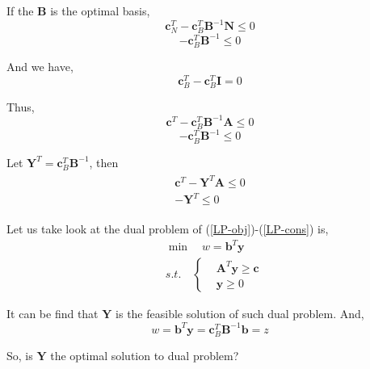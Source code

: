 \documentclass{article}
\begin{document}
If the $\bm{B}$ is the optimal basis, 
\begin{equation}
	\bm{c}^T_N - \bm{c}^T_B\bm{B}^{-1}\bm{N} \leq 0
\end{equation} 
\begin{equation}
	-\bm{c}^T_B\bm{B}^{-1} \leq 0
\end{equation}

And we have, 
\begin{equation}
	\bm{c}^T_B - \bm{c}^T_B\bm{I} = 0 
\end{equation}

Thus, 
\begin{equation}
	\bm{c}^T - \bm{c}^T_B\bm{B}^{-1}\bm{A} \leq 0
\end{equation}
\begin{equation}
	-\bm{c}^T_B \bm{B}^{-1} \leq 0
\end{equation}

Let $\bm{Y}^T = \bm{c}^T_B\bm{B}^{-1}$, then
\begin{align}
 	\begin{aligned}
 		\bm{c}^T - \bm{Y}^T\bm{A} \leq 0 \\
 		-\bm{Y}^T \leq 0
 	\end{aligned}
\end{align}

Let us take look at the dual problem of (\ref{LP-obj})-(\ref{LP-cons}) is,
\begin{align}
	& \min \quad w = \bm{b}^T\bm{y} \\
	& s.t. \quad \left\{
	\begin{aligned}
		& \bm{A}^T\bm{y} \geq \bm{c} \\
		& \bm{y} \geq 0
	\end{aligned} \right.
\end{align}

It can be find that $\bm{Y}$ is the feasible solution of such dual problem. And,
\begin{equation}
	w = \bm{b}^T\bm{y} = \bm{c}_B^T\bm{B}^{-1}\bm{b} = z
\end{equation}

So, is $\bm{Y}$ the optimal solution to dual problem?
\end{document}
